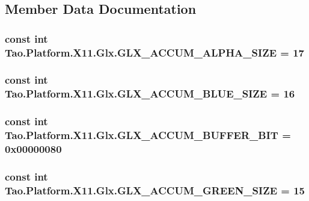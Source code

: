 \subsection{Member Data Documentation}
\hypertarget{class_tao_1_1_platform_1_1_x11_1_1_glx_a11689c37d75bdeb3e22db03566409f7a}{
\subsubsection[{GLX\_\-ACCUM\_\-ALPHA\_\-SIZE}]{\setlength{\rightskip}{0pt plus 5cm}const int {\bf Tao.Platform.X11.Glx.GLX\_\-ACCUM\_\-ALPHA\_\-SIZE} = 17}}
\label{class_tao_1_1_platform_1_1_x11_1_1_glx_a11689c37d75bdeb3e22db03566409f7a}
\hypertarget{class_tao_1_1_platform_1_1_x11_1_1_glx_aa3fc9fd7ced74f8f222a0f39b1c5983e}{
\subsubsection[{GLX\_\-ACCUM\_\-BLUE\_\-SIZE}]{\setlength{\rightskip}{0pt plus 5cm}const int {\bf Tao.Platform.X11.Glx.GLX\_\-ACCUM\_\-BLUE\_\-SIZE} = 16}}
\label{class_tao_1_1_platform_1_1_x11_1_1_glx_aa3fc9fd7ced74f8f222a0f39b1c5983e}
\hypertarget{class_tao_1_1_platform_1_1_x11_1_1_glx_a8522671492da2b591a4b4c8733dfbc97}{
\subsubsection[{GLX\_\-ACCUM\_\-BUFFER\_\-BIT}]{\setlength{\rightskip}{0pt plus 5cm}const int {\bf Tao.Platform.X11.Glx.GLX\_\-ACCUM\_\-BUFFER\_\-BIT} = 0x00000080}}
\label{class_tao_1_1_platform_1_1_x11_1_1_glx_a8522671492da2b591a4b4c8733dfbc97}
\hypertarget{class_tao_1_1_platform_1_1_x11_1_1_glx_a18384deeeed23b36efad9c2e843377a3}{
\subsubsection[{GLX\_\-ACCUM\_\-GREEN\_\-SIZE}]{\setlength{\rightskip}{0pt plus 5cm}const int {\bf Tao.Platform.X11.Glx.GLX\_\-ACCUM\_\-GREEN\_\-SIZE} = 15}}
